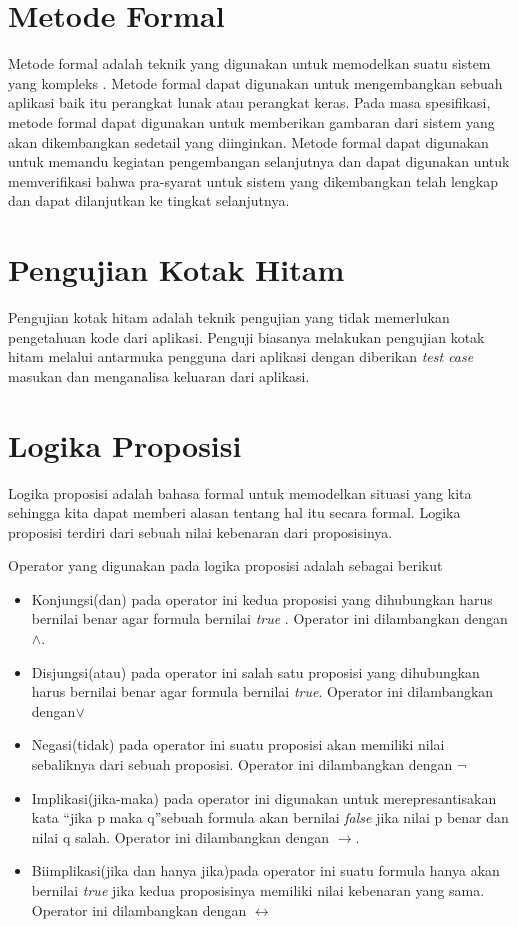 \section{Metode Formal}

Metode formal adalah teknik yang digunakan untuk memodelkan suatu
sistem yang kompleks \cite{huth2004logic}. Metode formal dapat digunakan untuk mengembangkan
sebuah aplikasi baik itu perangkat lunak atau perangkat keras. Pada
masa spesifikasi, metode formal dapat digunakan untuk memberikan gambaran
dari sistem yang akan dikembangkan sedetail yang diinginkan. Metode
formal dapat digunakan untuk memandu kegiatan pengembangan selanjutnya
dan dapat digunakan untuk memverifikasi bahwa pra-syarat untuk sistem yang
dikembangkan telah lengkap dan dapat dilanjutkan ke tingkat selanjutnya.

\section{Pengujian Kotak Hitam}

Pengujian kotak hitam adalah teknik pengujian yang tidak memerlukan pengetahuan kode dari aplikasi\cite{TEST1}. Penguji biasanya melakukan pengujian kotak hitam melalui antarmuka pengguna dari aplikasi dengan diberikan \textit{test case} masukan dan menganalisa keluaran dari aplikasi.

\section{Logika Proposisi}

Logika proposisi adalah bahasa formal untuk memodelkan situasi yang kita sehingga kita dapat memberi alasan tentang hal itu secara formal\cite{huth2004logic}. Logika proposisi terdiri dari sebuah nilai kebenaran dari proposisinya.

Operator yang digunakan pada logika proposisi adalah sebagai berikut

\begin{itemize}
	\item Konjungsi(dan) pada operator ini kedua proposisi yang dihubungkan harus bernilai benar agar formula bernilai \textit{true}
	. Operator ini dilambangkan dengan $\wedge$.
	\item Disjungsi(atau) pada operator ini salah satu proposisi yang dihubungkan harus bernilai benar agar formula bernilai \textit{true}. Operator ini dilambangkan dengan$\lor$ 
	\item Negasi(tidak) pada operator ini suatu proposisi akan memiliki nilai sebaliknya dari sebuah proposisi. Operator ini dilambangkan dengan $\neg$
	\item Implikasi(jika-maka) pada operator ini digunakan untuk merepresantisakan kata \textquotedblleft jika p maka q\textquotedblright sebuah formula akan bernilai \textit{false} jika nilai p benar dan nilai q salah. Operator ini dilambangkan dengan $\to$. 
	\item Biimplikasi(jika dan hanya jika)pada operator ini suatu formula hanya akan bernilai \textit{true} jika kedua proposisinya memiliki nilai kebenaran yang sama. Operator ini dilambangkan dengan $\leftrightarrow$
	
\end{itemize}

